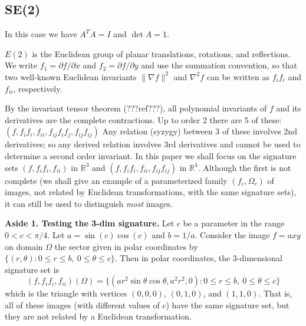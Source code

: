 \documentclass{article}
\begin{document}
\subsection{SE(2)}
In this case we have $A^TA = I$ and $\det A = 1$.

$E(2)$ is the Euclidean group of planar translations, rotations, and reflections.
We write $f_1 = \partial f/\partial x$ and $f_2 = \partial f/\partial y$ and use the summation convention, so that two well-known Euclidean invariants $\|\nabla f\|^2$ and $\nabla^2 f$ can be written as $f_i f_i$ and $f_{ii}$, respectively.

By the invariant tensor theorem (???ref???), all polynomial invariants of $f$ and its derivatives are the complete contractions. Up to order 2 there are 5 of these:
$ (f, f_i f_i, f_{ii}, f_{ij}f_i f_j, f_{ij}f_{ij})$
Any relation (syzygy) between 3 of these involves 2nd derivatives; so any derived relation involves 3rd derivatives and
cannot be used to determine a second order invariant. In this paper we shall focus on the signature sets
$ (f,f_i f_i,f_{ii})$
in $\mathbb{R}^3$
and
$(f, f_i f_i, f_{ii}, f_{ij}f_{ij})$
in $\mathbb{R}^4$. 
Although the first is not complete (we shall give an example of a parameterized family $(f_c,\Omega_c)$
of images, not related by Euclidean transformations, with the same signature sets), it can still
be used to distinguish {\em most} images.

\medskip

{\narrower\small

{\bf Aside 1. Testing the 3-dim signature.} Let $c$ be a parameter in the range $0<c<\pi/4$. Let $a = \sin(c)\cos(c)$ and $b=1/a$.
Consider the image $ f = a x y$ on domain $\Omega$ the sector  given in polar
coordinates by $\{(r,\theta)\colon 0 \le r \le b,\ 0 \le \theta \le c\}$.
Then in polar coordinates, the 3-dimensional signature set is
$$ (f, f_i f_i, f_{ii})(\Omega) = \{(ar^2 \sin\theta\cos\theta, a^2 r^2, 0)\colon 0 \le r \le b,\ 0 \le \theta \le c\}$$
which is the  triangle with vertices $(0,0,0)$, $(0,1,0)$, and $(1,1,0)$.
That is, all of these images (with different values of $c$) have the same signature set, but they are
not related by a Euclidean transformation.

}

\medskip
\end{document}
